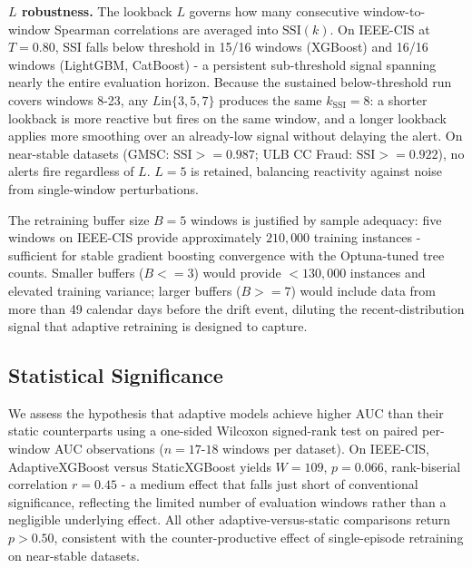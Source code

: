 \documentclass[pdflatex,sn-mathphys-num]{sn-jnl}
\theoremstyle{thmstyleone}
\theoremstyle{thmstyletwo}
\theoremstyle{thmstylethree}
\begin{document}
\textbf{$L$ robustness.} The lookback $L$ governs how many consecutive
window-to-window Spearman correlations are averaged into $\mathrm{SSI}(k)$.
On IEEE-CIS at $T = 0.80$, SSI falls below threshold in 15/16 windows
(XGBoost) and 16/16 windows (LightGBM, CatBoost) - a persistent
sub-threshold signal spanning nearly the entire evaluation horizon. Because
the sustained below-threshold run covers windows 8-23, any $L \mathbin{\mathrm{in}} \{3, 5, 7\}$
produces the same $k_{\mathrm{SSI}} = 8$: a shorter lookback is more reactive
but fires on the same window, and a longer lookback applies more smoothing over
an already-low signal without delaying the alert. On near-stable datasets
(GMSC: $\mathrm{SSI} \mathrel{>=} 0.987$; ULB CC Fraud: $\mathrm{SSI} \mathrel{>=} 0.922$),
no alerts fire regardless of $L$. $L = 5$ is retained, balancing reactivity
against noise from single-window perturbations.

The retraining buffer size $B = 5$ windows is justified by sample adequacy:
five windows on IEEE-CIS provide approximately $210{,}000$ training instances
- sufficient for stable gradient boosting convergence with the Optuna-tuned
tree counts. Smaller buffers ($B \mathrel{<=} 3$) would provide $<130{,}000$ instances
and elevated training variance; larger buffers ($B \mathrel{>=} 7$) would include data
from more than 49 calendar days before the drift event, diluting the
recent-distribution signal that adaptive retraining is designed to capture.

\subsection{Statistical Significance}\label{sec:res:stats}

We assess the hypothesis that adaptive models achieve higher AUC than their
static counterparts using a one-sided Wilcoxon signed-rank test on paired
per-window AUC observations ($n = 17$-$18$ windows per dataset). On IEEE-CIS,
AdaptiveXGBoost versus StaticXGBoost yields $W = 109$, $p = 0.066$,
rank-biserial correlation $r = 0.45$ - a medium effect that falls just short
of conventional significance, reflecting the limited number of evaluation
windows rather than a negligible underlying effect. All other
adaptive-versus-static comparisons return $p > 0.50$, consistent with the
counter-productive effect of single-episode retraining on near-stable datasets.
\end{document}
